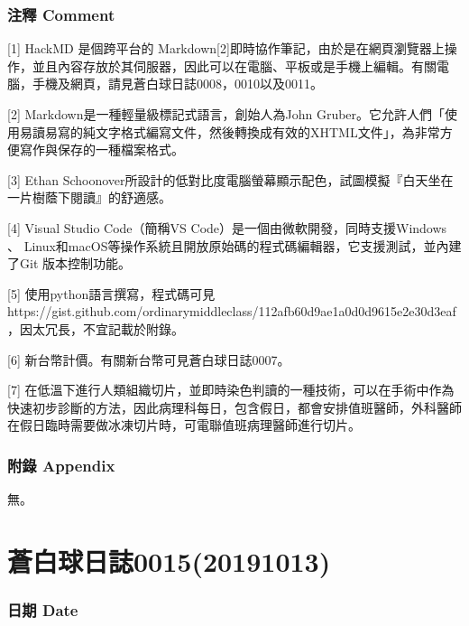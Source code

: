 \documentclass[a5paper, 12pt
]{book}
\begin{document}
\hypertarget{ux6ce8ux91cb-comment-7}{%
\subsubsection{注釋 Comment}\label{ux6ce8ux91cb-comment-7}}

{[}1{]} HackMD 是個跨平台的
Markdown{[}2{]}即時協作筆記，由於是在網頁瀏覽器上操作，並且內容存放於其伺服器，因此可以在電腦、平板或是手機上編輯。有關電腦，手機及網頁，請見蒼白球日誌0008，0010以及0011。

{[}2{]} Markdown是一種輕量級標記式語言，創始人為John
Gruber。它允許人們「使用易讀易寫的純文字格式編寫文件，然後轉換成有效的XHTML文件」，為非常方便寫作與保存的一種檔案格式。

{[}3{]} Ethan
Schoonover所設計的低對比度電腦螢幕顯示配色，試圖模擬『白天坐在一片樹蔭下閱讀』的舒適感。

{[}4{]} Visual Studio Code（簡稱VS
Code）是一個由微軟開發，同時支援Windows 、
Linux和macOS等操作系統且開放原始碼的程式碼編輯器，它支援測試，並內建了Git
版本控制功能。

{[}5{]} 使用python語言撰寫，程式碼可見
https://gist.github.com/ordinarymiddleclass/112afb60d9ae1a0d0d9615e2e30d3eaf
，因太冗長，不宜記載於附錄。

{[}6{]} 新台幣計價。有關新台幣可見蒼白球日誌0007。

{[}7{]}
在低溫下進行人類組織切片，並即時染色判讀的一種技術，可以在手術中作為快速初步診斷的方法，因此病理科每日，包含假日，都會安排值班醫師，外科醫師在假日臨時需要做冰凍切片時，可電聯值班病理醫師進行切片。

\hypertarget{ux9644ux9304-appendix-6}{%
\subsubsection{附錄 Appendix}\label{ux9644ux9304-appendix-6}}

無。

\hypertarget{ux84bcux767dux7403ux65e5ux8a8c001520191013}{%
\section{蒼白球日誌0015(20191013)}\label{ux84bcux767dux7403ux65e5ux8a8c001520191013}}

\hypertarget{ux65e5ux671f-date-12}{%
\subsubsection{日期 Date}\label{ux65e5ux671f-date-12}}
\end{document}

